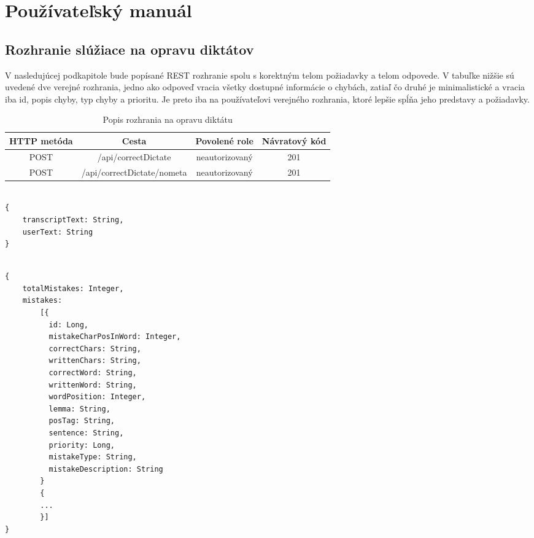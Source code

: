 \documentclass[12pt,oneside]{fithesis2}
\begin{document}
    \appendix
\chapter{Používateľský manuál} 	  %

	\section{Rozhranie slúžiace na opravu diktátov} \label{navod_oprava}
      \par V nasledujúcej podkapitole bude popísané REST rozhranie spolu s korektným telom požiadavky a telom odpovede. V tabuľke nižšie sú uvedené dve verejné rozhrania, jedno ako odpoveď vracia všetky dostupné informácie o chybách, zatiaľ čo druhé je minimalistické a vracia iba id, popis chyby, typ chyby a prioritu. Je preto iba na používateľovi verejného rozhrania, ktoré lepšie spĺňa jeho predstavy a požiadavky.
\begin{table}[htbp]
\centering
\begin{tabular}{@{}|c|c|c|c|@{}}
\hline
\textbf{HTTP metóda} & \textbf{Cesta} & \textbf{Povolené role} & \textbf{Návratový kód}  \\ \hline
           POST     &  /api/correctDictate         &     neautorizovaný       &    201        \\ \hline
            POST     &  /api/correctDictate/nometa         &     neautorizovaný       &    201        \\ \hline

\end{tabular}
\caption{Popis rozhrania na opravu diktátu}
\label{rozhranie-oprava}
\end{table}
\lstset{language=Java}          %
\begin{lstlisting}[frame=single]  % Start your code-block

{ 
	transcriptText: String,
	userText: String
}
\end{lstlisting}
\bigskip
\lstset{language=Java}          %
\begin{lstlisting}[frame=single]  % Start your code-block

{ 
	totalMistakes: Integer,
	mistakes: 
		[{ 
		  id: Long,
		  mistakeCharPosInWord: Integer,
		  correctChars: String,
		  writtenChars: String,
		  correctWord: String,
		  writtenWord: String,
		  wordPosition: Integer,
		  lemma: String,
		  posTag: String,
		  sentence: String,
		  priority: Long,
		  mistakeType: String,
		  mistakeDescription: String 	
		}
		{
		...
		}]	
}
\end{lstlisting}
\end{document}
